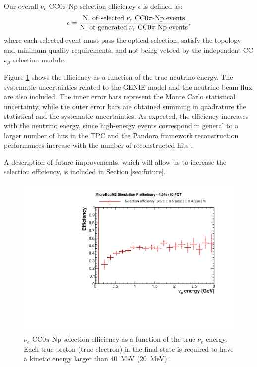Our overall $\nu_{e}$ CC$0\pi$-Np selection efficiency $\epsilon$ is defined as:
\begin{equation}
\epsilon = \frac{\mathrm{N.~of~selected~}\nu_{e}\mathrm{~CC0}\pi\mathrm{{\text -}Np~events}}{\mathrm{N.~of~generated~}\nu_{e}\mathrm{~CC0}\pi\mathrm{{\text -}Np~events}},
\end{equation}
where each selected event must pass the optical selection, satisfy the topology and minimum quality requirements, and not being vetoed by the independent CC $\nu_{\mu}$ selection module. 


Figure \ref{fig:effpurity} shows the efficiency as a function of the true neutrino energy.
The systematic uncertainties related to the GENIE model and the neutrino beam flux are also included. The inner error bars represent the Monte Carlo statistical uncertainty, while the outer error bars are obtained summing in quadrature the statistical and the systematic uncertainties. 
As expected, the efficiency increases with the neutrino energy, since high-energy events correspond in general to a larger number of hits in the TPC and the Pandora framework reconstruction performances increase with the number of reconstructed hits \cite{pandora2}. 

A description of future improvements, which will allow us to increase the selection efficiency, is included in Section \ref{sec:future}.


\begin{figure}
\centering
    \includegraphics[width=0.65\linewidth]{figures/eff.pdf}
  \caption{$\nu_{e}$ CC$0\pi$-Np selection efficiency as a function of the true $\nu_{e}$ energy. Each true proton (true electron) in the final state is required to have a kinetic energy larger than 40~MeV (20~MeV).}
  \label{fig:effpurity}
\end{figure}

